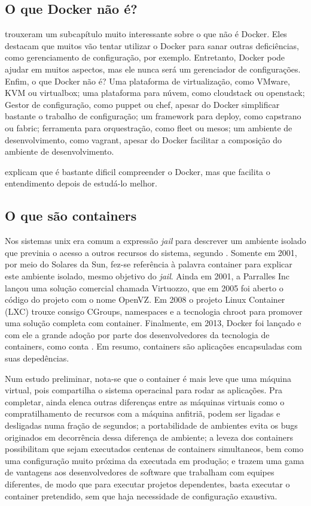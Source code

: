\documentclass[
	12pt,				%
	openright,			%
	oneside,			%
	a4paper,			%
	chapter=TITLE,		%
	section=TITLE,		%
	english,			%
	french,				%
	spanish,			%
	brazil				%
	]{abntex2}
\begin{document}
\subsection{O que Docker não é?}

 trouxeram um subcapítulo muito interessante sobre o que não é Docker. Eles destacam que muitos vão tentar utilizar o Docker para sanar outras deficiências, como gerenciamento de configuração, por exemplo. Entretanto, Docker pode ajudar em muitos aspectos, mas ele nunca será um gerenciador de configurações. Enfim, o que Docker não é? Uma plataforma de virtualização, como VMware, KVM ou virtualbox; uma plataforma para núvem, como cloudstack ou openstack; Gestor de configuração, como puppet ou chef, apesar do Docker simplificar bastante o trabalho de configuração; um framework para deploy, como capstrano ou fabric; ferramenta para orquestração, como fleet ou mesos; um ambiente de desenvolvimento, como vagrant, apesar do Docker facilitar a composição do ambiente de desenvolvimento.

 explicam que é bastante dificil compreender o Docker, mas que facilita o entendimento depois de estudá-lo melhor.

\subsection{O que são containers}

Nos sistemas unix era comum a expressão \textit{jail} para descrever um ambiente isolado que previnia o acesso a outros recursos do sistema, segundo . Somente em 2001, por meio do Solares da Sun, fez-se referência à palavra container para explicar este ambiente isolado, mesmo objetivo do \textit{jail}. Ainda em 2001, a Parralles Inc lançou uma solução comercial chamada Virtuozzo, que em 2005 foi aberto o código do projeto com o nome OpenVZ. Em 2008 o projeto Linux Container (LXC) trouxe consigo CGroups, namespaces e a tecnologia chroot para promover uma solução completa com container. Finalmente, em 2013, Docker foi lançado e com ele a grande adoção por parte dos desenvolvedores da tecnologia de containers, como conta . Em resumo, containers são aplicações encapsuladas com suas depedências.

Num estudo preliminar, nota-se que o container é mais leve que uma máquina virtual, pois compartilha o sistema operacinal para rodar as aplicações. Pra completar, ainda elenca outras diferenças entre as máquinas virtuais como o compratilhamento de recursos com a máquina anfitriã, podem ser ligadas e desligadas numa fração de segundos; a portabilidade de ambientes evita os bugs originados em decorrência dessa diferença de ambiente; a leveza dos containers possibilitam que sejam executados centenas de containers simultaneos, bem como uma configuração muito próxima da executada em produção; e trazem uma gama de vantagens aos desenvolvedores de software que trabalham com equipes diferentes, de modo que para executar projetos dependentes, basta executar o container pretendido, sem que haja necessidade de configuração exaustiva.
\end{document}
